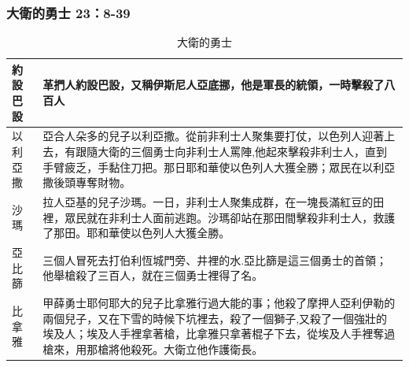 \subsubsection{大衛的勇士 23：8-39}

\begin{table}[!hbp]
\centering 
\begin{tabular}{|p{}|p{}|}
\hline
\hline
約設巴設& 革捫人約設巴設，又稱伊斯尼人亞底挪，他是軍長的統領，一時擊殺了八百人 \\\hline
以利亞撒& 亞合人朵多的兒子以利亞撒。從前非利士人聚集要打仗，以色列人迎著上去，有跟隨大衛的三個勇士向非利士人罵陣,他起來擊殺非利士人，直到手臂疲乏，手黏住刀把。那日耶和華使以色列人大獲全勝；眾民在以利亞撒後頭專奪財物。\\\hline
沙瑪& 拉人亞基的兒子沙瑪。一日，非利士人聚集成群，在一塊長滿紅豆的田裡，眾民就在非利士人面前逃跑。沙瑪卻站在那田間擊殺非利士人，救護了那田。耶和華使以色列人大獲全勝。\\\hline
亞比篩 & 三個人冒死去打伯利恆城門旁、井裡的水.亞比篩是這三個勇士的首領；他舉槍殺了三百人，就在三個勇士裡得了名。  \\\hline
比拿雅 &甲薛勇士耶何耶大的兒子比拿雅行過大能的事；他殺了摩押人亞利伊勒的兩個兒子，又在下雪的時候下坑裡去，殺了一個獅子,又殺了一個強壯的埃及人；埃及人手裡拿著槍，比拿雅只拿著棍子下去，從埃及人手裡奪過槍來，用那槍將他殺死。大衛立他作護衛長。 \\\hline
\end{tabular}
\caption{大衛的勇士}
\end{table}

